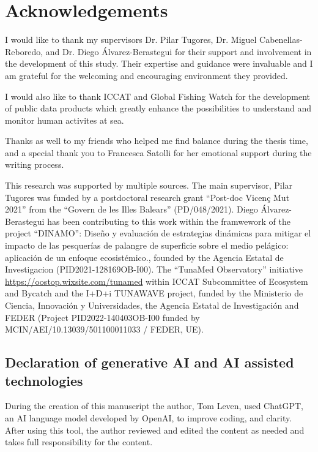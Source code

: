 \chapter{Acknowledgements}

I would like to thank my supervisors Dr. Pilar Tugores, Dr. Miguel Cabenellas-Reboredo, and Dr.
Diego Álvarez-Berastegui for their support and involvement in the development of this study. Their
expertise and guidance were invaluable and I am grateful for the welcoming and encouraging
environment they provided.

\medskip

I would also like to thank ICCAT and Global Fishing Watch for the development of public data
products which greatly enhance the possibilities to understand and monitor human activites at sea.

\medskip

Thanks as well to my friends who helped me find balance during the thesis time, and a special thank
you to Francesca Satolli for her emotional support during the writing process.

\medskip

This research was supported by multiple sources. The main supervisor, Pilar Tugores was funded by a
postdoctoral research grant ``Post-doc Vicenç Mut 2021'' from the ``Govern de les Illes Balears''
(PD/048/2021). Diego Álvarez-Berastegui has been contributing to this work within the framwework of
the project ``DINAMO'': Diseño y evaluación de estrategias dinámicas para mitigar el impacto de las
pesquerías de palangre de superficie sobre el medio pelágico: aplicación de un enfoque
ecosistémico., founded by the Agencia Estatal de Investigacion (PID2021-128169OB-I00). The
``TunaMed Observatory'' initiative \url{https://oostop.wixsite.com/tunamed} within ICCAT
Subcommittee of Ecosystem and Bycatch and the I+D+i TUNAWAVE project, funded by the Ministerio de
Ciencia, Innovación y Universidades, the Agencia Estatal de Investigación and FEDER (Project
PID2022-140403OB-I00 funded by MCIN/AEI/10.13039/501100011033 / FEDER, UE).

\section{Declaration of generative AI and AI assisted technologies}

During the creation of this manuscript the author, Tom Leven, used ChatGPT, an AI language model
developed by OpenAI, to improve coding, and clarity. After using this tool, the author reviewed and
edited the content as needed and takes full responsibility for the content.


